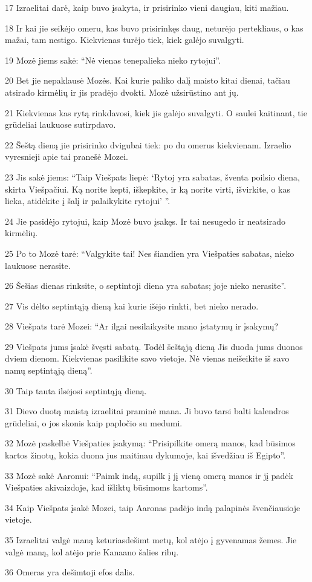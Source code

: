 \par 17 Izraelitai darė, kaip buvo įsakyta, ir prisirinko vieni daugiau, kiti mažiau. 
\par 18 Ir kai jie seikėjo omeru, kas buvo prisirinkęs daug, neturėjo pertekliaus, o kas mažai, tam nestigo. Kiekvienas turėjo tiek, kiek galėjo suvalgyti. 
\par 19 Mozė jiems sakė: “Nė vienas tenepalieka nieko rytojui”. 
\par 20 Bet jie nepaklausė Mozės. Kai kurie paliko dalį maisto kitai dienai, tačiau atsirado kirmėlių ir jis pradėjo dvokti. Mozė užsirūstino ant jų. 
\par 21 Kiekvienas kas rytą rinkdavosi, kiek jis galėjo suvalgyti. O saulei kaitinant, tie grūdeliai laukuose sutirpdavo. 
\par 22 Šeštą dieną jie prisirinko dvigubai tiek: po du omerus kiekvienam. Izraelio vyresnieji apie tai pranešė Mozei. 
\par 23 Jis sakė jiems: “Taip Viešpats liepė: ‘Rytoj yra sabatas, šventa poilsio diena, skirta Viešpačiui. Ką norite kepti, iškepkite, ir ką norite virti, išvirkite, o kas lieka, atidėkite į šalį ir palaikykite rytojui’ ”. 
\par 24 Jie pasidėjo rytojui, kaip Mozė buvo įsakęs. Ir tai nesugedo ir neatsirado kirmėlių. 
\par 25 Po to Mozė tarė: “Valgykite tai! Nes šiandien yra Viešpaties sabatas, nieko laukuose nerasite. 
\par 26 Šešias dienas rinksite, o septintoji diena yra sabatas; joje nieko nerasite”. 
\par 27 Vis dėlto septintąją dieną kai kurie išėjo rinkti, bet nieko nerado. 
\par 28 Viešpats tarė Mozei: “Ar ilgai nesilaikysite mano įstatymų ir įsakymų? 
\par 29 Viešpats jums įsakė švęsti sabatą. Todėl šeštąją dieną Jis duoda jums duonos dviem dienom. Kiekvienas pasilikite savo vietoje. Nė vienas neišeikite iš savo namų septintąją dieną”. 
\par 30 Taip tauta ilsėjosi septintąją dieną. 
\par 31 Dievo duotą maistą izraelitai praminė mana. Ji buvo tarsi balti kalendros grūdeliai, o jos skonis kaip papločio su medumi. 
\par 32 Mozė paskelbė Viešpaties įsakymą: “Prisipilkite omerą manos, kad būsimos kartos žinotų, kokia duona jus maitinau dykumoje, kai išvedžiau iš Egipto”. 
\par 33 Mozė sakė Aaronui: “Paimk indą, supilk į jį vieną omerą manos ir jį padėk Viešpaties akivaizdoje, kad išliktų būsimoms kartoms”. 
\par 34 Kaip Viešpats įsakė Mozei, taip Aaronas padėjo indą palapinės švenčiausioje vietoje. 
\par 35 Izraelitai valgė maną keturiasdešimt metų, kol atėjo į gyvenamas žemes. Jie valgė maną, kol atėjo prie Kanaano šalies ribų. 
\par 36 Omeras yra dešimtoji efos dalis.



